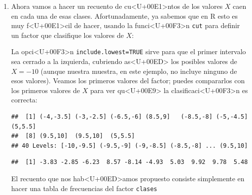 \documentclass[10pt,a4paper]{article}
\begin{document}
\begin{enumerate}
\item Ahora vamos a hacer un recuento de cu<U+00E1>ntos de los valores $X$ caen en cada una de esas clases. Afortunadamente, ya sabemos que en R esto es muy f<U+00E1>cil de hacer, usando la funci<U+00F3>n {\tt cut} para definir un factor que clasifique los valores de $X$:

\begin{knitrout}
\color{fgcolor}\begin{kframe}
\begin{alltt}
 \hlkwb{=}   \hlstd{=}\hlstd{)}
\end{alltt}
\end{kframe}
\end{knitrout}
La opci<U+00F3>n {\tt include.lowest=TRUE} sirve para que el primer intervalo sea cerrado a la izquierda, cubriendo as<U+00ED> los posibles valores de $X=-10$ (aunque nuestra muestra, en este ejemplo, no incluye ninguno de esos valores). Veamos los primeros valores del factor; puedes compararlos con los primeros valores de $X$ para ver qu<U+00E9> la clasificaci<U+00F3>n es correcta:
\begin{knitrout}
\color{fgcolor}\begin{kframe}
\begin{alltt}
 \hlstd{)}
\end{alltt}
\begin{verbatim}
##  [1] (-4,-3.5] (-3,-2.5] (-6.5,-6] (8.5,9]   (-8.5,-8] (-5,-4.5] (5,5.5]  
##  [8] (9.5,10]  (9.5,10]  (5,5.5]  
## 40 Levels: [-10,-9.5] (-9.5,-9] (-9,-8.5] (-8.5,-8] ... (9.5,10]
\end{verbatim}
\begin{alltt}
 \hlstd{)}
\end{alltt}
\begin{verbatim}
##  [1] -3.83 -2.85 -6.23  8.57 -8.14 -4.93  5.03  9.92  9.78  5.48
\end{verbatim}
\end{kframe}
\end{knitrout}
El recuento que nos hab<U+00ED>amos propuesto consiste simplemente en hacer una tabla de frecuencias del factor {\tt clases}
\begin{knitrout}
\color{fgcolor}\begin{kframe}

\end{kframe}
\end{knitrout}
\end{enumerate}
\end{document}
